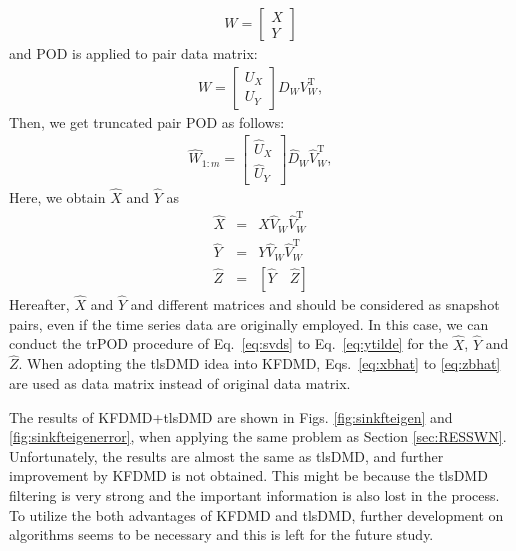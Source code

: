 \documentclass[aip,graphicx]{revtex4-1}
\begin{document}
\begin{eqnarray}
W=\left[\begin{array}{c}
X\\Y
\end{array}\right]
\end{eqnarray}
and POD is applied to pair data matrix:
\begin{eqnarray}
W=\left[\begin{array}{c}U_{X}\\U_{Y}\end{array}\right]D_{W}V^{\text{T}}_{W},
\end{eqnarray}
Then, we get truncated pair POD as follows:
\begin{eqnarray}
\widehat{W}_{1:m}=\left[\begin{array}{c}\widehat{U}_{X}\\\widehat{U}_{Y}\end{array}\right]\widehat{D}_{W}\widehat{V}^{\text{T}}_{W},
\end{eqnarray}
Here, we obtain $\widehat{X}$ and $\widehat{Y}$ as
\begin{eqnarray}
\widehat{X}&=&X\widehat{V}_{W}\widehat{V}_{W}^{\text{T}}\label{eq:xbhat}\\
\widehat{Y}&=&Y\widehat{V}_{W}\widehat{V}_{W}^{\text{T}}\label{eq:ybhat}\\
\widehat{Z}&=&[\widehat{Y} \quad \widehat{Z}]\label{eq:zbhat}
\end{eqnarray}
Hereafter, $\widehat{X}$ and $\widehat{Y}$ and different matrices and should be considered as snapshot pairs, even if the time series data are originally employed. In this case, we can conduct the trPOD procedure of Eq.~\ref{eq:svds} to Eq.~\ref{eq:ytilde} for the  $\widehat{X}$, $\widehat{Y}$ and $\widehat{Z}$.
When adopting the tlsDMD idea into KFDMD, Eqs.~\ref{eq:xbhat} to \ref{eq:zbhat} are used as data matrix instead of original data matrix. 

The results of KFDMD+tlsDMD are shown in Figs. \ref{fig:sinkfteigen} and \ref{fig:sinkfteigenerror}, when applying the same problem as Section \ref{sec:RESSWN}. Unfortunately, the results are almost the same as tlsDMD, and further improvement by KFDMD is not obtained. This might be because the tlsDMD filtering is very strong and the important information is also lost in the process.  To utilize the both advantages of KFDMD and tlsDMD, further development on algorithms seems to be necessary and this is left for the future study. 
\end{document}
